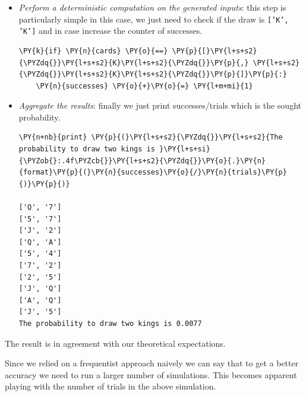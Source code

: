 \begin{itemize}
\begin{codebox}
\begin{Verbatim}[commandchars=\\\{\}]
\PY{k}{for} \PY{n}{i} \PY{o+ow}{in} \PY{n+nb}{range}\PY{p}{(}\PY{n}{trials}\PY{p}{)}\PY{p}{:}
  \PY{n}{cards} \PY{o}{=} \PY{n}{sample}\PY{p}{(}\PY{n}{deck}\PY{p}{,} \PY{n}{k}\PY{o}{=}\PY{l+m+mi}{2}\PY{p}{)}
  \PY{k}{if} \PY{n}{i} \PY{o}{\PYZlt{}} \PY{l+m+mi}{10}\PY{p}{:}
    \PY{n+nb}{print} \PY{p}{(}\PY{n}{cards}\PY{p}{)}
\end{Verbatim}
\end{codebox}

\item \emph{Perform a deterministic computation on the generated inputs}: this step is particularly simple in this case, we just need to check if the draw is \texttt{['K', 'K']} and in case increase the counter of successes.

\begin{codebox}
\begin{Verbatim}[commandchars=\\\{\}]
  \PY{k}{if} \PY{n}{cards} \PY{o}{==} \PY{p}{[}\PY{l+s+s2}{\PYZdq{}}\PY{l+s+s2}{K}\PY{l+s+s2}{\PYZdq{}}\PY{p}{,} \PY{l+s+s2}{\PYZdq{}}\PY{l+s+s2}{K}\PY{l+s+s2}{\PYZdq{}}\PY{p}{]}\PY{p}{:}
    \PY{n}{successes} \PY{o}{+}\PY{o}{=} \PY{l+m+mi}{1}
 \end{Verbatim}
\end{codebox}

\item \emph{Aggregate the results}: finally we just print successes/trials which is the sought probability.

\begin{codebox}
\begin{Verbatim}[commandchars=\\\{\}]
\PY{n+nb}{print} \PY{p}{(}\PY{l+s+s2}{\PYZdq{}}\PY{l+s+s2}{The probability to draw two kings is }\PY{l+s+si}{\PYZob{}:.4f\PYZcb{}}\PY{l+s+s2}{\PYZdq{}}\PY{o}{.}\PY{n}{format}\PY{p}{(}\PY{n}{successes}\PY{o}{/}\PY{n}{trials}\PY{p}{)}\PY{p}{)}

['Q', '7']
['5', '7']
['J', '2']
['Q', 'A']
['5', '4']
['7', '2']
['2', '5']
['J', 'Q']
['A', 'Q']
['J', '5']
The probability to draw two kings is 0.0077
    \end{Verbatim}
\end{codebox}
\end{itemize}
The result is in agreement with our theoretical expectations.

Since we relied on a frequentist approach naively we can say that to
get a better accuracy we need to run a larger number of simulations.
This becomes apparent playing with the number of trials in the above 
simulation. 

